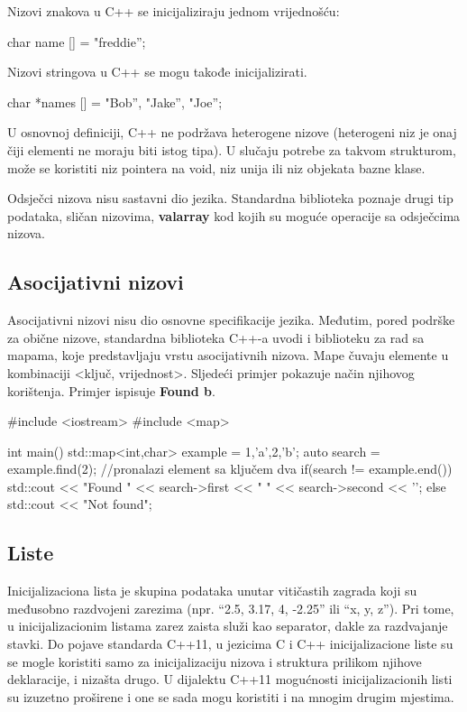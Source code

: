 \documentclass[11pt]{book}
\begin{document}
Nizovi znakova u C++ se inicijaliziraju jednom vrijednošću:

\begin{shortlisting}
  char name [] = "freddie”;
\end{shortlisting}

Nizovi stringova u C++ se mogu takođe inicijalizirati.

\begin{shortlisting}
  char *names [] = {"Bob”, "Jake”, "Joe”};
\end{shortlisting}

U osnovnoj definiciji, C++ ne podržava heterogene nizove (heterogeni niz je onaj čiji elementi ne moraju biti istog tipa). U slučaju potrebe za takvom strukturom, može se koristiti niz pointera na void, niz unija ili niz objekata bazne klase.

Odsječci nizova nisu sastavni dio jezika. Standardna biblioteka poznaje drugi tip podataka, sličan nizovima, \textbf{valarray} kod kojih su moguće operacije sa odsječcima nizova.

\subsection{Asocijativni nizovi}
Asocijativni nizovi nisu dio osnovne specifikacije jezika. Međutim, pored  podrške  za  obične  nizove,  standardna  biblioteka  C++-a  uvodi  i  biblioteku  za  rad sa mapama, koje predstavljaju vrstu asocijativnih nizova. Mape čuvaju elemente u kombinaciji <ključ, vrijednost>.  Sljedeći primjer pokazuje način njihovog korištenja. Primjer ispisuje \textbf{Found b}.

\begin{shortlisting}
  #include <iostream>
  #include <map>

  int main()
    {
      std::map<int,char> example = {{1,'a'},{2,'b'}};
      auto search = example.find(2); //pronalazi element sa ključem dva
      if(search != example.end()) {
          std::cout << "Found " << search->first << " " << search->second << '\n';
        }
      else {
          std::cout << "Not found\n";
        }
    }
\end{shortlisting}

\subsection{Liste}  %

Inicijalizaciona  lista  je  skupina  podataka  unutar  vitičastih  zagrada  koji  su  međusobno razdvojeni zarezima (npr. “{2.5, 3.17, 4, -2.25}” ili “{x, y, z}”). Pri tome, u inicijalizacionim listama zarez zaista služi kao separator, dakle za razdvajanje stavki. Do pojave standarda C++11, u jezicima  C  i  C++  inicijalizacione  liste  su  se  mogle koristiti  samo  za  inicijalizaciju  nizova  i struktura  prilikom  njihove deklaracije, i  nizašta  drugo.  U  dijalektu  C++11  mogućnosti inicijalizacionih listi su izuzetno proširene i one se sada mogu koristiti i na mnogim drugim mjestima.
\end{document}
